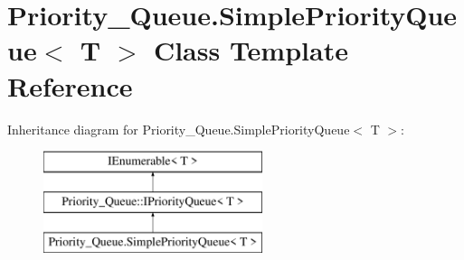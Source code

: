 \hypertarget{class_priority___queue_1_1_simple_priority_queue}{}\section{Priority\+\_\+\+Queue.\+Simple\+Priority\+Queue$<$ T $>$ Class Template Reference}
\label{class_priority___queue_1_1_simple_priority_queue}
Inheritance diagram for Priority\+\_\+\+Queue.\+Simple\+Priority\+Queue$<$ T $>$\+:\begin{figure}[H]
\begin{center}
\leavevmode
\includegraphics[height=3.000000cm]{class_priority___queue_1_1_simple_priority_queue}
\end{center}
\end{figure}
